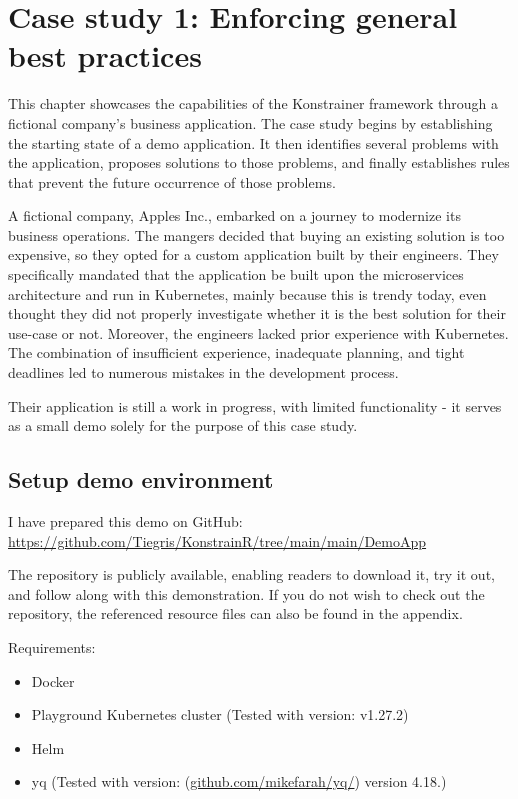 \chapter{Case study 1: Enforcing general best practices}
\label{chap:case_study1}

This chapter showcases the capabilities of the Konstrainer framework through a fictional company's business application. The case study begins by establishing the starting state of a demo application. It then identifies several problems with the application, proposes solutions to those problems, and finally establishes rules that prevent the future occurrence of those problems.

A fictional company, Apples Inc., embarked on a journey to modernize its business operations. The mangers decided that buying an existing solution is too expensive, so they opted for a custom application built by their engineers. They specifically mandated that the application be built upon the microservices architecture and run in Kubernetes, mainly because this is trendy today, even thought they did not properly investigate whether it is the best solution for their use-case or not. Moreover, the engineers lacked prior experience with Kubernetes. The combination of insufficient experience, inadequate planning, and tight deadlines led to numerous mistakes in the development process.

Their application is still a work in progress, with limited functionality - it serves as a small demo solely for the purpose of this case study.

\section{Setup demo environment}

I have prepared this demo on GitHub: \url{https://github.com/Tiegris/KonstrainR/tree/main/main/DemoApp}

The repository is publicly available, enabling readers to download it, try it out, and follow along with this demonstration. If you do not wish to check out the repository, the referenced resource files can also be found in the appendix.

Requirements:

\begin{itemize}
    \item Docker
    \item Playground Kubernetes cluster (Tested with version: v1.27.2)
    \item Helm
    \item yq (Tested with version: (\url{github.com/mikefarah/yq/}) version 4.18.)
\end{itemize}

